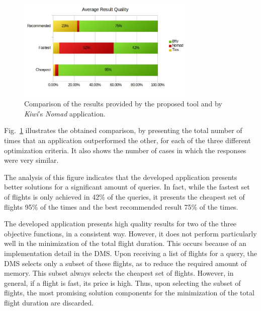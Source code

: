\begin{figure}[!b]
    \centering
    \includegraphics[width=8.5cm]{./imgs/average_result_quality.jpg}
    \caption{Comparison of the results provided by the proposed tool and by \textit{Kiwi}'s \textit{Nomad} application.}
    \label{fig:quality_apis}
\end{figure}

Fig.~\ref{fig:quality_apis} illustrates the obtained comparison, by presenting the total number of times that an application outperformed the other, for each of the three different optimization criteria. It also shows the number of cases in which the responses were very similar.

The analysis of this figure indicates that the developed application presents better solutions for a significant amount of queries. In fact, while the fastest set of flights is only achieved in 42\% of the queries, it presents the cheapest set of flights 95\% of the times and the best recommended result 75\% of the times. 

The developed application presents high quality results for two of the three objective functions, in a consistent way. However, it does not perform particularly well in the minimization of the total flight duration. This occurs because of an implementation detail in the DMS. Upon receiving a list of flights for a query, the DMS selects only a subset of these flights, as to reduce the required amount of memory. This subset always selects the cheapest set of flights. However, in general, if a flight is fast, its price is high. Thus, upon selecting the subset of flights, the most promising solution components for the minimization of the total flight duration are discarded.







